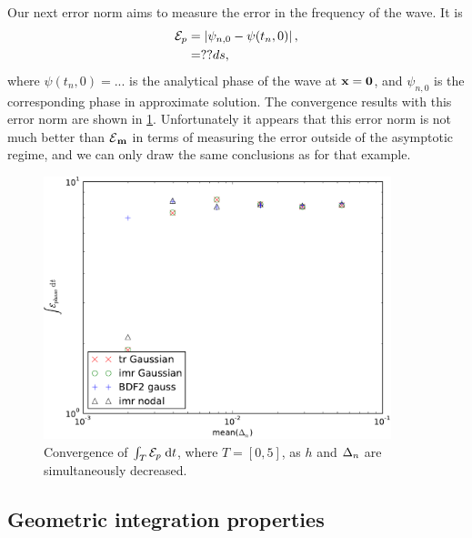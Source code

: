 Our next error norm aims to measure the error in the frequency of the wave.
It is
\begin{equation}
  \begin{aligned}
    \mathcal{E}_p &= \left|{\psi_{n,0} - \psi(t_n, 0)} \right|, \\
    &= ??ds,
  \end{aligned}
\end{equation}
where $\psi(t_n, 0) = ...$ is the analytical phase of the wave at $\boldsymbol{\mathrm{x}} = \mathbf{0}$, and $\psi_{n,0}$ is the corresponding phase in approximate solution.
The convergence results with this error norm are shown in \cref{fig:convergence-long-time-phase-norm}.
Unfortunately it appears that this error norm is not much better than $\mathcal{E}{}_{\boldsymbol{\mathrm{m}}}$ in terms of measuring the error outside of the asymptotic regime, and we can only draw the same conclusions as for that example.
\begin{figure}
  \centering
  \includegraphics[width=0.9\textwidth]{plots/2d_wave_solution_convergence_long_time/auxerr0integralvsmeanofdts.pdf}
  \caption{Convergence of ${\int_T {\mathcal{E}_p} {\; \mathrm{{d}}} t}$, where $T=[0,5]$, as $h$ and $\Delta_{n}$ are simultaneously decreased.}
  \label{fig:convergence-long-time-phase-norm}
\end{figure}



\subsection{Geometric integration properties}
\label{sec:2d-wave-results-cons-prop}

